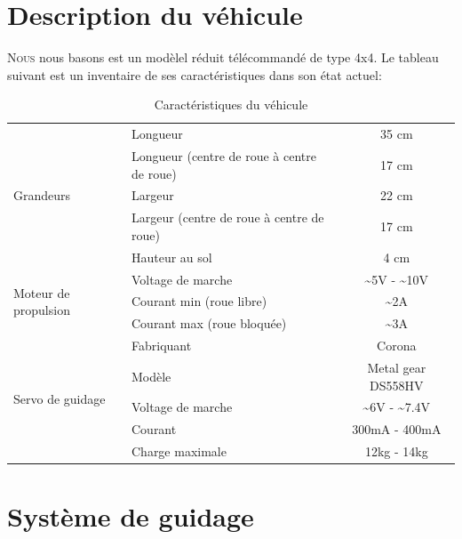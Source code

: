 \documentclass[a4paper,11pt]{report}
\begin{document}
{\section{Description du véhicule \label{TableDesc}}
\lettrine{N}{ous} nous basons est un modèlel r\'eduit
t\'el\'ecommand\'e de type 4x4. Le tableau suivant est un inventaire de 
ses caractéristiques dans son \'etat actuel:
\begin{table}[h!]
\begin{center}
  \begin{tabular}{|p{4cm}|p{4cm}|c|}
    \hline
    \multirow{5}{*}{Grandeurs}
    &Longueur & 35 cm \\ \cline{2-3}
    &Longueur (centre de roue \`a centre de roue)& 17 cm \\ \cline{2-3}
    &Largeur & 22 cm \\ \cline{2-3}
    &Largeur (centre de roue \`a centre de roue) & 17 cm \\ \cline{2-3}
    & Hauteur au sol & 4 cm\\ \hline
    \multirow{3}{*}{Moteur de propulsion}
    & Voltage de marche & \~{}5V - \~{}10V  \\ \cline{2-3}
    & Courant min (roue libre) & \~{}2A \\ \cline{2-3}
    & Courant max (roue bloqu\'ee) & \~{}3A \\ \hline
    \multirow{5}{*}{Servo de guidage}
    & Fabriquant & Corona \\ \cline{2 - 3}
    & Modèle & Metal gear DS558HV\\ \cline{2-3}
    & Voltage de marche & \~{}6V - \~{}7.4V  \\ \cline{2-3}
    & Courant & 300mA - 400mA \\ \cline{2-3}
    & Charge maximale & 12kg - 14kg \\  
 \hline
	\end{tabular}
\end{center}
\caption{Caractéristiques du véhicule}
\end{table}

\section{Système de guidage}


}
\end{document}
